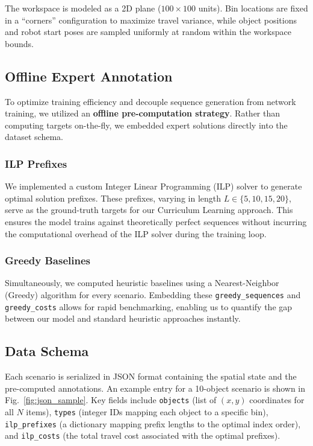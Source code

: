 \documentclass[conference]{IEEEtran}
\begin{document}
The workspace is modeled as a 2D plane ($100 \times 100$ units). Bin locations are fixed in a ``corners'' configuration to maximize travel variance, while object positions and robot start poses are sampled uniformly at random within the workspace bounds.

\subsection{Offline Expert Annotation}
To optimize training efficiency and decouple sequence generation from network training, we utilized an \textbf{offline pre-computation strategy}. Rather than computing targets on-the-fly, we embedded expert solutions directly into the dataset schema.

\subsubsection{ILP Prefixes}
We implemented a custom Integer Linear Programming (ILP) solver to generate optimal solution prefixes. These prefixes, varying in length $L \in \{5, 10, 15, 20\}$, serve as the ground-truth targets for our Curriculum Learning approach. This ensures the model trains against theoretically perfect sequences without incurring the computational overhead of the ILP solver during the training loop.

\subsubsection{Greedy Baselines}
Simultaneously, we computed heuristic baselines using a Nearest-Neighbor (Greedy) algorithm for every scenario. Embedding these \texttt{greedy\_sequences} and \texttt{greedy\_costs} allows for rapid benchmarking, enabling us to quantify the gap between our model and standard heuristic approaches instantly.

\subsection{Data Schema}
Each scenario is serialized in JSON format containing the spatial state and the pre-computed annotations. An example entry for a 10-object scenario is shown in Fig.~\ref{fig:json_sample}. Key fields include \texttt{objects} (list of $(x, y)$ coordinates for all $N$ items), \texttt{types} (integer IDs mapping each object to a specific bin), \texttt{ilp\_prefixes} (a dictionary mapping prefix lengths to the optimal index order), and \texttt{ilp\_costs} (the total travel cost associated with the optimal prefixes).
\end{document}
